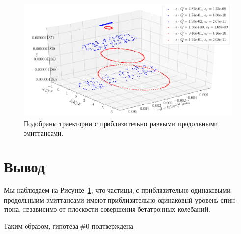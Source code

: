 \documentclass{article}
\begin{document}
\begin{figure}[h]
  \centering
  \includegraphics[height=.3\paperheight]{../../img/STUNE_TRAJ_TEST/3D_plot_all_ps_vars_equal_long_emi}
  \caption{Подобраны траектории с приблизительно равными продольными эмиттансами.\label{fig:gamma_eff}}
\end{figure}

\section{Вывод}
Мы наблюдаем на Рисунке~\ref{fig:gamma_eff}, что частицы, с приблизительно одинаковыми продольныим эмиттансами
имеют приблизительно одинаковый уровень спин-тюна, независимо от плоскости совершения бетатронных колебаний.

Таким образом, гипотеза \#0 подтверждена.
\end{document}
